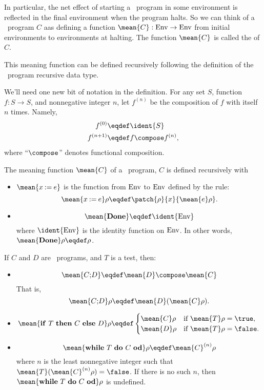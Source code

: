 In particular, the net effect of starting a \while\ program in some
environment is reflected in the final environment when the program
halts.  So we can think of a \while\ program $C$ aas defining a
function $\mean{C}:\Env \to \Env$ from initial environments to
environments at halting.  The function $\mean{C}$ is called
the  of $C$.
\iffalse
$\mean{C}$ of a \while\ program, $C$ to be a partial function from $\Env$ to $\Env$
mapping an initial environment to the final halting environment.
\fi
This meaning function can be defined recursively following the
definition of the \while\ program recursive data type.

We'll need one new bit of notation in the definition.  For any set
$S$, function $f:S \to S$, and nonnegative integer $n$, let $f^{(n)}$
be the composition of $f$ with itself $n$ times.  Namely,
\begin{align*}
f^{(0)} & \eqdef \ident{S}\\
f^{(n+1)} & \eqdef f \compose f^{(n)},
\end{align*}
where ``$\compose$'' denotes functional composition.

\begin{definition}
The meaning function $\mean{C}$ of a \while\ program, $C$ is defined recursively with

\begin{itemize}

\item $\mean{x \assigned e}$ is the function from $\Env$ to $\Env$ defined
  by the rule:
\[
\mean{x \assigned e}\rho \eqdef \patch{\rho}{x}{\mean{e}\rho}.
\]

\item
\[
\mean{\halt} \eqdef \ident{\Env}
\]
where $\ident{\Env}$ is the identity function on $\Env$.  In other words,
$\mean{\halt}\rho \eqdef \rho$.

\end{itemize}

If $C$ and $D$ are \while\ programs, and $T$ is a test, then:
\begin{itemize}

\item
\[
\mean{\seqcomm{C}{D}} \eqdef \mean{D} \compose \mean{C}
\]
That is,
\[
\mean{\seqcomm{C}{D}}\rho \eqdef \mean{D}(\mean{C}\rho).
\]

\item
\[
\mean{\condcomm{T}{C}{D}}\rho
\eqdef
\begin{cases}
\mean{C}\rho & \text{if } \mean{T}\rho = \true,\\
\mean{D}\rho & \text{if } \mean{T}\rho = \false.
\end{cases}
\]

\item
\[
\mean{\wloop{T}{C}}\rho \eqdef \mean{C}^{(n)}\rho
\]
where $n$ is the least nonnegative integer such that
$\mean{T}(\mean{C}^{(n)}\rho) = \false$.  If there is no such $n$, then
$\mean{\wloop{T}{C}}\rho$ is undefined.
\end{itemize}

\end{definition}

